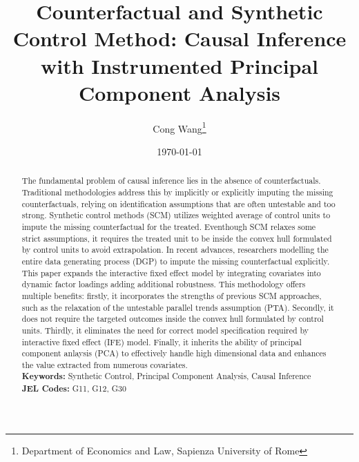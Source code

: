 \documentclass[12pt]{article}
\begin{document}
\newtheorem{assumption}{Assumption}

\begin{titlepage}
\title{Counterfactual and Synthetic Control Method: Causal Inference with Instrumented Principal Component Analysis}
\author{ Cong Wang\thanks{Department of Economics and Law, Sapienza University of Rome}}
\date{\today}
\maketitle
\begin{abstract}
\noindent The fundamental problem of causal inference lies in the absence of counterfactuals. Traditional methodologies address this by implicitly or explicitly imputing the missing counterfactuals, relying on identification assumptions that are often untestable and too strong. Synthetic control methods (SCM) utilizes weighted average of control units to impute the missing counterfactual for the treated. Eventhough SCM relaxes some strict assumptions, it requires the treated unit to be inside the convex hull formulated by control units to avoid extrapolation. In recent advances, researchers modelling the entire data generating process (DGP) to impute the missing counterfactual explicitly. This paper expands the interactive fixed effect model by integrating covariates into dynamic factor loadings adding additional robustness. This methodology offers multiple benefits: firstly, it incorporates the strengths of previous SCM approaches, such as the relaxation of the untestable parallel trends assumption (PTA). Secondly, it does not require the targeted outcomes inside the convex hull formulated by control units. Thirdly, it eliminates the need for correct model specification required by interactive fixed effect (IFE) model. Finally, it inherits the ability of principal component anlaysis (PCA) to effectively handle high dimensional data and enhances the value extracted from numerous covariates.\\

\noindent\textbf{Keywords:} Synthetic Control, Principal Component Analysis, Causal Inference\\

\noindent\textbf{JEL Codes:} G11, G12, G30\\
\bigskip
\end{abstract}
\setcounter{page}{0}
\thispagestyle{empty}
\end{titlepage}
\pagebreak \newpage
\end{document}
